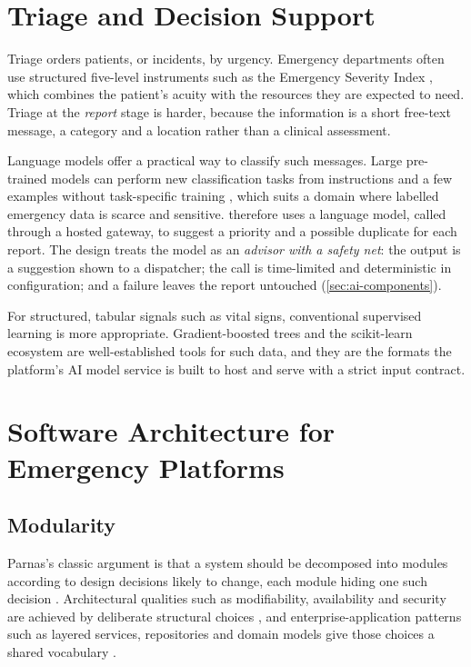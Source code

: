 \section{Triage and Decision Support}

Triage orders patients, or incidents, by urgency. Emergency departments often use structured five-level
instruments such as the Emergency Severity Index \cite{gilboy2012esi}, which combines the patient's acuity
with the resources they are expected to need. Triage at the \emph{report} stage is harder, because the
information is a short free-text message, a category and a location rather than a clinical assessment.

Language models offer a practical way to classify such messages. Large pre-trained models can perform new
classification tasks from instructions and a few examples without task-specific training
\cite{brown2020gpt3}, which suits a domain where labelled emergency data is scarce and sensitive.
\ProjectName{} therefore uses a language model, called through a hosted gateway, to suggest a priority and a
possible duplicate for each report. The design treats the model as an \emph{advisor with a safety net}: the output is a
suggestion shown to a dispatcher; the call is time-limited and deterministic in configuration; and a failure
leaves the report untouched (\cref{sec:ai-components}).

For structured, tabular signals such as vital signs, conventional supervised learning is more appropriate.
Gradient-boosted trees \cite{chen2016xgboost} and the scikit-learn ecosystem \cite{pedregosa2011sklearn} are
well-established tools for such data, and they are the formats the platform's AI model service is built to host
and serve with a strict input contract.

\section{Software Architecture for Emergency Platforms}

\subsection{Modularity}
Parnas's classic argument is that a system should be decomposed into modules according to design decisions
likely to change, each module hiding one such decision \cite{parnas1972decomposing}. Architectural qualities
such as modifiability, availability and security are achieved by deliberate structural choices
\cite{bass2021software}, and enterprise-application patterns such as layered services, repositories and
domain models give those choices a shared vocabulary \cite{fowler2002peaa,evans2003ddd}.

